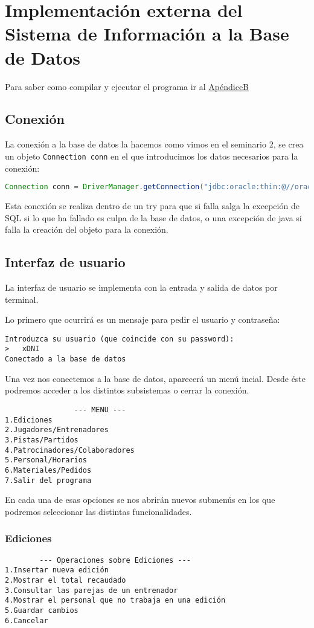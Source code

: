 \section{Implementación externa del Sistema de Información a la Base de Datos}
Para saber como compilar y ejecutar el programa ir al
\hyperref[cap:instrucciones]{ApéndiceB}

\subsection{Conexión}
La conexión a la base de datos la hacemos como vimos en el seminario 2, se crea
un objeto \texttt{Connection conn} en el que introducimos los datos necesarios para
la conexión:
\begin{lstlisting}[language=java]
Connection conn = DriverManager.getConnection("jdbc:oracle:thin:@//oracle0.ugr.es:1521/practbd.oracle0.ugr.es", "xDNI", "xDNI")
\end{lstlisting}

Esta conexión se realiza dentro de un try para que si falla salga la excepción de
SQL si lo que ha fallado es culpa de la base de datos, o una excepción de java
si falla la creación del objeto para la conexión.

\subsection{Interfaz de usuario}
La interfaz de usuario se implementa con la entrada y salida de datos por
terminal.

Lo primero que ocurrirá es un mensaje para pedir el usuario y contraseña:
\begin{lstlisting}
Introduzca su usuario (que coincide con su password):
>	xDNI
Conectado a la base de datos
\end{lstlisting}

Una vez nos conectemos a la base de datos, aparecerá un menú incial. Desde éste
podremos acceder a los distintos subsistemas o cerrar la conexión.

\begin{lstlisting}
				--- MENU ---
1.Ediciones
2.Jugadores/Entrenadores
3.Pistas/Partidos
4.Patrocinadores/Colaboradores
5.Personal/Horarios
6.Materiales/Pedidos
7.Salir del programa
\end{lstlisting}

En cada una de esas opciones se nos abrirán nuevos submenús en los que podremos
seleccionar las distintas funcionalidades.

\subsubsection{Ediciones}
\begin{lstlisting}
		--- Operaciones sobre Ediciones ---
1.Insertar nueva edición
2.Mostrar el total recaudado
3.Consultar las parejas de un entrenador
4.Mostrar el personal que no trabaja en una edición
5.Guardar cambios
6.Cancelar
\end{lstlisting}

